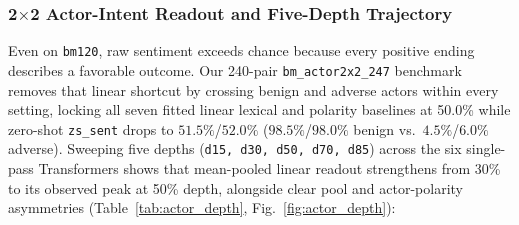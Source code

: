 \documentclass[conference]{IEEEtran}
\begin{document}
\subsubsection{\texorpdfstring{2$\times$2 Actor-Intent Readout and Five-Depth Trajectory}{2x2 Actor-Intent Readout and Five-Depth Trajectory}}
\label{sec:actor_depth}
Even on \texttt{bm120}, raw sentiment exceeds chance because every positive ending describes a favorable outcome. Our 240-pair \texttt{bm\_actor2x2\_247} benchmark removes that linear shortcut by crossing benign and adverse actors within every setting, locking all seven fitted linear lexical and polarity baselines at 50.0\% while zero-shot \texttt{zs\_sent} drops to $51.5\%$/$52.0\%$ ($98.5\%$/$98.0\%$ benign vs.\ $4.5\%$/$6.0\%$ adverse). Sweeping five depths (\texttt{d15, d30, d50, d70, d85}) across the six single-pass Transformers shows that mean-pooled linear readout strengthens from 30\% to its observed peak at 50\% depth, alongside clear pool and actor-polarity asymmetries (Table~\ref{tab:actor_depth}, Fig.~\ref{fig:actor_depth}):
\end{document}
